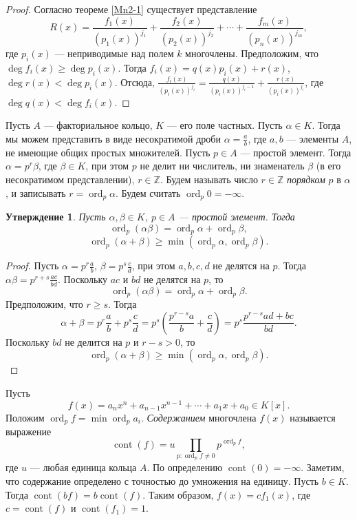 \documentclass[12pt, titlepage, oneside]{amsbook}
\newcommand{\ord}{\operatorname{ord}}
\newcommand{\cont}{\operatorname{cont}}
\newcommand{\ZZ}{\mathbb{Z}}
\newtheorem{claim}[theorem]{Утверждение}
\theoremstyle{definition}
\theoremstyle{remark}
\begin{document}
\begin{proof}
	Согласно теореме \ref{Mn2-1} существует представление $$R(x)=\frac{f_1(x)}{(p_1(x))^{j_1}}+\frac{f_2(x)}{(p_2(x))^{j_2}}+\cdots+\frac{f_m(x)}{(p_n(x))^{j_m}},$$ где $p_i(x)$ --- неприводимые над полем $k$ многочлены. Предположим, что $\deg f_i(x)\geq\deg p_i(x)$. Тогда $f_i(x)=q(x)p_i(x)+r(x)$, $\deg r(x)<\deg p_i(x)$. Отсюда, $\frac{f_i(x)}{(p_i(x))^{j_i}}=\frac{q(x)}{(p_i(x))^{j_i-1}}+\frac{r(x)}{(p_i(x))^{j_i}}$, где $\deg q(x)<\deg f_i(x)$.
\end{proof}

Пусть $A$ --- факториальное кольцо, $K$ --- его поле частных. Пусть $\alpha\in K$. Тогда мы можем представить в виде несократимой дроби $\alpha=\frac{a}{b}$, где $a,b$ --- элементы $A$, не имеющие общих простых множителей. Пусть $p\in A$ --- простой элемент. Тогда $\alpha=p^r\beta$, где $\beta\in K$, при этом $p$ не делит ни числитель, ни знаменатель $\beta$ (в его несократимом представлении), $r\in\ZZ$. Будем называть число $r\in\ZZ$ \emph{порядком} $p$ в $\alpha$, и записывать $r=\ord_p\alpha$. Будем считать $\ord_p 0=-\infty$.

\begin{claim}
	\label{Mn2-3}
	Пусть $\alpha,\beta\in K$, $p\in A$ --- простой элемент. Тогда
	$$\ord_p(\alpha\beta)=\ord_p\alpha+\ord_p\beta,$$ $$\ord_p(\alpha+\beta)\geq\min(\ord_p\alpha,\ord_p\beta).$$
\end{claim}

\begin{proof}
	Пусть $\alpha=p^r\frac{a}{b}$, $\beta=p^s\frac{c}{d}$, при этом $a,b,c,d$ не делятся на $p$. Тогда $\alpha\beta=p^{r+s}\frac{ac}{bd}$. Поскольку $ac$ и $bd$ не делятся на $p$, то $$\ord_p(\alpha\beta)=\ord_p\alpha+\ord_p\beta.$$ Предположим, что $r\geq s$. Тогда $$\alpha+\beta=p^r\frac{a}{b}+p^s\frac{c}{d}=p^s\left(\frac{p^{r-s}a}{b}+\frac{c}{d}\right)=p^s\frac{p^{r-s}ad+bc}{bd}.$$ Поскольку $bd$ не делится на $p$ и $r-s>0$, то $$\ord_p(\alpha+\beta)\geq\min(\ord_p\alpha,\ord_p\beta).$$
\end{proof}

Пусть $$f(x)=a_nx^n+a_{n-1}x^{n-1}+\cdots+a_1x+a_0\in K[x].$$ Положим $\ord_p f=\min\ord_p a_i$. \emph{Содержанием} многочлена $f(x)$ называется выражение $$\cont(f)=u\prod\limits_{p\colon\ord_p f\neq 0}p^{\ord_p f},$$ где $u$ --- любая единица кольца $A$. По определению $\cont(0)=-\infty$. Заметим, что содержание определено с точностью до умножения на единицу. Пусть $b\in K$. Тогда $\cont(bf)=b\cont(f)$. Таким образом, $f(x)=c f_1(x)$, где $c=\cont(f)$ и $\cont(f_1)=1$.
\end{document}
